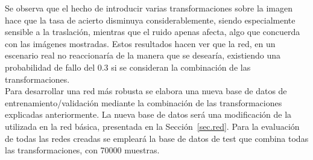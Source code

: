 Se observa que el hecho de introducir varias transformaciones sobre la imagen hace que la tasa de acierto disminuya considerablemente, siendo especialmente sensible a la traslación, mientras que el ruido apenas afecta, algo que concuerda con las imágenes mostradas. Estos resultados hacen ver que la red, en un escenario real no reaccionaría de la manera que se desearía, existiendo una probabilidad de fallo del 0.3 si se consideran la combinación de las transformaciones.\\

Para desarrollar una red más robusta se elabora una nueva base de datos de entrenamiento/validación mediante la combinación de las transformaciones explicadas anteriormente. La nueva base de datos será una modificación de la utilizada en la red básica, presentada en la Sección~\ref{sec.red}. Para la evaluación de todas las redes creadas se empleará la base de datos de test que combina todas las transformaciones, con 70000 muestras.\\


